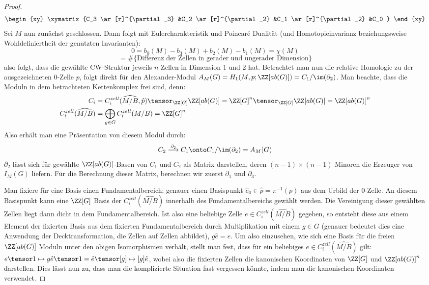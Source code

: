 \begin{proof}
	\[
		\begin{xy}
		\xymatrix{C_3 \ar[r]^{\partial_3}  &C_2 \ar[r]^{\partial_2}  &C_1 \ar[r]^{\partial_2} &C_0 }
		\end{xy}
	\]
	Sei $M$ nun zunächst geschlossen. Dann folgt mit Eulercharakteristik und Poincaré Dualität (und Homotopieinvarianz beziehungsweise Wohldefiniertheit der genutzten Invarianten):
	\[
		0=b_0(M)-b_3(M)+b_2(M)-b_1(M) = \chi(M) 
	\]
	\[
		= \#\{\text{Differenz der Zellen in gerader und ungerader Dimension}\}
	\]
	also folgt, dass die gewählte CW-Struktur jeweils $n$ Zellen in Dimension 1 und 2 hat. Betrachtet man nun die relative Homologie zu der ausgezeichneten $0$-Zelle $p$, folgt direkt für den Alexander-Modul $A_M(G)= H_1(M,p;\ZZ[ab(G)])=C_1/\im(\partial _2)$. Man beachte, dass die Moduln in dem betrachteten Kettenkomplex frei sind, denn: 
	\begin{align*}
		C_i &=C_i^{zell}(\widehat{M/B},\hat p)\tensor_{\ZZ[G]}\ZZ[ab(G)] = \ZZ[G]^n \tensor_{\ZZ[G]} \ZZ[ab(G)] = \ZZ[ab(G)]^n\\
		C_i^{zell}(\widehat{M/B}) &= \bigoplus_{g \in G} C_i^{zell}(M/B) = \ZZ[G]^n
	\end{align*}
	Also erhält man eine Präsentation von diesem Modul durch:
	\[
		C_2 \stackrel {\partial_2} \longrightarrow C_1 \onto C_1/\im(\partial_2) = A_M(G)
	\]
	$\partial_2$ lässt sich für gewählte $\ZZ[ab(G)]$-Basen von $C_1$ und $C_2$ als Matrix darstellen, deren $(n-1)\times (n-1)$ Minoren die Erzeuger von $I_M(G)$ liefern. Für die Berechnung dieser Matrix, berechnen wir zuerst $\partial_1$ und $\partial_3$.

	Man fixiere für eine Basis einen Fundamentalbereich; genauer einen Basispunkt $\hat e_0 \in \hat p = \pi^{-1}(p)$ aus dem Urbild der 0-Zelle. An diesem Basispunkt kann eine $\ZZ[G]$ Basis der $C_i^{zell}(\widehat{ M/B})$ innerhalb des Fundamentalbereichs gewählt werden. Die Vereinigung dieser gewählten Zellen liegt dann dicht in dem Fundamentalbereich. Ist also eine beliebige Zelle $e \in C_i^{zell}(\widehat{ M/B})$ gegeben, so entsteht diese aus einem Element der fixierten Basis aus dem fixierten Fundamentalbereich durch Multiplikation mit einem $g\in G$ (genauer bedeutet dies eine Anwendung der Decktransformation, die Zellen auf Zellen abbildet), $g\hat e = e$. Um also einzusehen, wie sich eine Basis für die freien $\ZZ[ab(G)]$ Moduln unter den obigen Isomorphismen verhält, stellt man fest, dass für ein beliebiges $e\in C_i^{zell}(\widehat{ M/B})$ gilt: $e\tensor 1 \mapsto g\hat e \tensor 1 = \hat e \tensor [g] \mapsto [g]\hat e $, wobei also die fixierten Zellen die kanonischen Koordinaten von $\ZZ[G]$ und $\ZZ[ab(G)]^n$ darstellen. Dies lässt nun zu, dass man die komplizierte Situation fast vergessen könnte, indem man die kanonischen Koordinaten verwendet. 


\end{proof}
